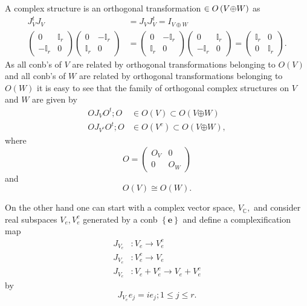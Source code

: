 \documentclass[aps,preprint]{revtex4}
\begin{document}
A complex structure is an orthogonal transformation $\in O\left( V\mathbf{%
\oplus}W\right) $ as 
\begin{align}
J_{V}^{t}J_{V} & =J_{V}J_{V}^{t}=I_{V\oplus W} \\
\left( 
\begin{array}{cc}
0 & \mathbb{I}_{r} \\ 
-\mathbb{I}_{r} & 0%
\end{array}
\right) \left( 
\begin{array}{cc}
0 & -\mathbb{I}_{r} \\ 
\mathbb{I}_{r} & 0%
\end{array}
\right) & =\left( 
\begin{array}{cc}
0 & -\mathbb{I}_{r} \\ 
\mathbb{I}_{r} & 0%
\end{array}
\right) \left( 
\begin{array}{cc}
0 & \mathbb{I}_{r} \\ 
-\mathbb{I}_{r} & 0%
\end{array}
\right) =\left( 
\begin{array}{cc}
\mathbb{I}_{r} & 0 \\ 
0 & \mathbb{I}_{r}%
\end{array}
\right) .
\end{align}
As all conb's of $V$ are related by orthogonal transformations belonging to $%
O\left( V\right) $ and all conb's of $W$ are related by orthogonal
transformations belonging to $O\left( W\right) $ it is easy to see that the
family of orthogonal complex structures on $V$ and $W$ are given by 
\begin{align}
OJ_{V}O^{t};O & \in O\left( V\right) \subset O\left( V\mathbf{\oplus }%
W\right) \\
OJ_{V^{c}}O^{t};O & \in O\left( V^{c}\right) \subset O\left( V\mathbf{\oplus}%
W\right) ,
\end{align}
where 
\begin{equation}
O=\left( 
\begin{array}{cc}
O_{V} & 0 \\ 
0 & O_{W}%
\end{array}
\right)
\end{equation}
and 
\begin{equation}
O\left( V\right) \cong O\left( W\right) .
\end{equation}

On the other hand one can start with a complex vector space, $V_{\mathbb{C}%
}, $ and consider real subspaces $V_{e},V_{e}^{c}$ generated by a conb $%
\left\{ \mathbf{e}\right\} $ and define a complexification map 
\begin{align}
J_{V_{e}} & :V_{e}\rightarrow V_{e}^{c} \\
J_{V_{e}} & :V_{e}^{c}\rightarrow V_{e} \\
J_{V_{e}} & :V_{e}+V_{e}^{c}\rightarrow V_{e}+V_{e}^{c}
\end{align}
by 
\begin{equation}
J_{V_{e}}e_{j}=ie_{j};1\leq j\leq r.
\end{equation}
\end{document}
